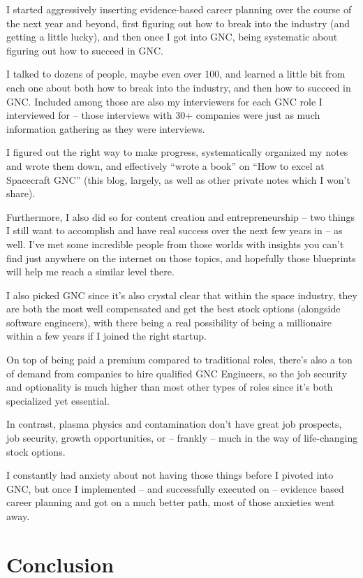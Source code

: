 \documentclass[11pt]{article}
\begin{document}
I started aggressively inserting evidence-based career planning over the course of the next year and beyond, first figuring out how to break into the industry (and getting a little lucky), and then once I got into GNC, being systematic about figuring out how to succeed in GNC.

I talked to dozens of people, maybe even over 100, and learned a little bit from each one about both how to break into the industry, and then how to succeed in GNC. Included among those are also my interviewers for each GNC role I interviewed for -- those interviews with 30+ companies were just as much information gathering as they were interviews.

I figured out the right way to make progress, systematically organized my notes and wrote them down, and effectively ``wrote a book'' on ``How to excel at Spacecraft GNC'' (this blog, largely, as well as other private notes which I won't share).

Furthermore, I also did so for content creation and entrepreneurship -- two things I still want to accomplish and have real success over the next few years in -- as well. I've met some incredible people from those worlds with insights you can't find just anywhere on the internet on those topics, and hopefully those blueprints will help me reach a similar level there.

I also picked GNC since it's also crystal clear that within the space industry, they are both the most well compensated and get the best stock options (alongside software engineers), with there being a real possibility of being a millionaire within a few years if I joined the right startup.

On top of being paid a premium compared to traditional roles, there's also a ton of demand from companies to hire qualified GNC Engineers, so the job security and optionality is much higher than most other types of roles since it's both specialized yet essential.

In contrast, plasma physics and contamination don't have great job prospects, job security, growth opportunities, or -- frankly -- much in the way of life-changing stock options.

I constantly had anxiety about not having those things before I pivoted into GNC, but once I implemented -- and successfully executed on -- evidence based career planning and got on a much better path, most of those anxieties went away.

\section*{Conclusion}
\end{document}
